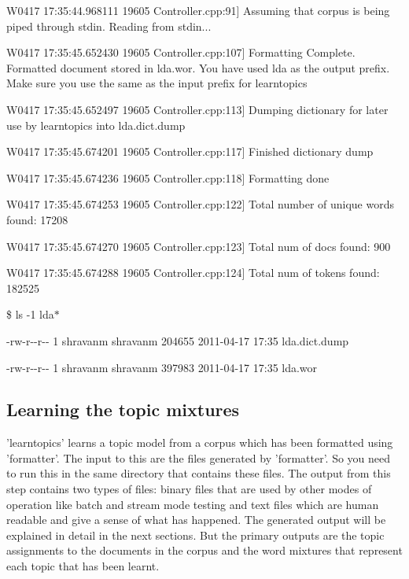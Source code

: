 {\ttfamily   }

{\ttfamily W0417 17:35:44.968111 19605 Controller.cpp:91\mbox{]} Assuming that corpus is being piped through stdin. Reading from stdin...  }

{\ttfamily W0417 17:35:45.652430 19605 Controller.cpp:107\mbox{]} Formatting Complete. Formatted document stored in lda.wor. You have used lda as the output prefix. Make sure you use the same as the input prefix for learntopics  }

{\ttfamily W0417 17:35:45.652497 19605 Controller.cpp:113\mbox{]} Dumping dictionary for later use by learntopics into lda.dict.dump  }

{\ttfamily W0417 17:35:45.674201 19605 Controller.cpp:117\mbox{]} Finished dictionary dump  }

{\ttfamily W0417 17:35:45.674236 19605 Controller.cpp:118\mbox{]} Formatting done  }

{\ttfamily W0417 17:35:45.674253 19605 Controller.cpp:122\mbox{]} Total number of unique words found: 17208  }

{\ttfamily W0417 17:35:45.674270 19605 Controller.cpp:123\mbox{]} Total num of docs found: 900  }

{\ttfamily W0417 17:35:45.674288 19605 Controller.cpp:124\mbox{]} Total num of tokens found: 182525 }

{\ttfamily \$ ls -\/1 lda$\ast$ }

{\ttfamily -\/rw-\/r-\/-\/r-\/-\/ 1 shravanm shravanm 204655 2011-\/04-\/17 17:35 lda.dict.dump  }

{\ttfamily -\/rw-\/r-\/-\/r-\/-\/ 1 shravanm shravanm 397983 2011-\/04-\/17 17:35 lda.wor  } 

\par
  \hypertarget{single__machine__usage_learntopics}{}\subsection{Learning the topic mixtures}\label{single__machine__usage_learntopics}
'learntopics' learns a topic model from a corpus which has been formatted using 'formatter'. The input to this are the files generated by 'formatter'. So you need to run this in the same directory that contains these files. The output from this step contains two types of files: binary files that are used by other modes of operation like batch and stream mode testing and text files which are human readable and give a sense of what has happened. The generated output will be explained in detail in the next sections. But the primary outputs are the topic assignments to the documents in the corpus and the word mixtures that represent each topic that has been learnt. 

